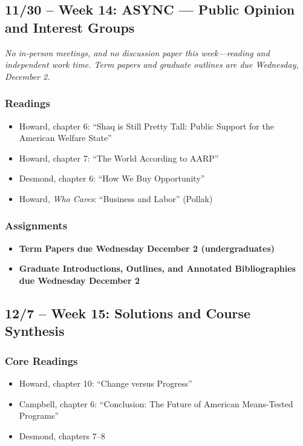 \documentclass[12pt]{article}
\begin{document}
\subsection*{11/30 -- Week 14: \textbf{ASYNC} --- Public Opinion and Interest Groups}
\emph{No in-person meetings, and no discussion paper this week---reading and independent work time. Term papers and graduate outlines are due Wednesday, December 2.}
    \subsubsection*{Readings}
        \begin{itemize}
            \item Howard, chapter 6: ``Shaq is Still Pretty Tall: Public Support for the American Welfare State''
            \item Howard, chapter 7: ``The World According to AARP''
            \item Desmond, chapter 6: ``How We Buy Opportunity''
            \item Howard, \emph{Who Cares}: ``Business and Labor'' (Pollak)
        \end{itemize}
    \subsubsection*{Assignments}
        \begin{itemize}
            \item \textbf{Term Papers due Wednesday December 2 (undergraduates)}
            \item \textbf{Graduate Introductions, Outlines, and Annotated Bibliographies due Wednesday December 2}
        \end{itemize}

\subsection*{12/7 -- Week 15: Solutions and Course Synthesis}
    \subsubsection*{Core Readings}
        \begin{itemize}
            \item Howard, chapter 10: ``Change versus Progress''
            \item Campbell, chapter 6: ``Conclusion: The Future of American Means-Tested Programs''
            \item Desmond, chapters 7--8
        \end{itemize}
\end{document}
